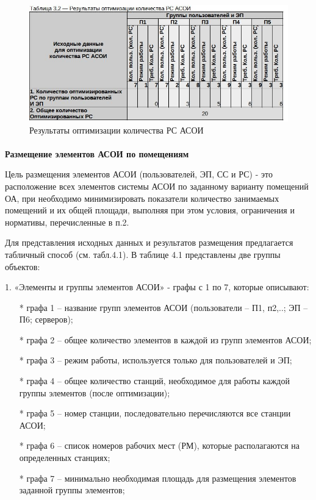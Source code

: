 \documentclass[12pt, a4paper, simple]{eskdtext}
\begin{document}
    \begin{figure}[ht!]
        \centering
        \includegraphics[width=14cm]
            {_docs/Таблица3-2РезультатыОптимизацииКоличестваРСАСОИ.jpg}
        \caption{Результаты оптимизации количества РС АСОИ}
    \end{figure}

    \paragraph{} \textbf{Размещение элементов АСОИ по помещениям}

    Цель размещения элементов АСОИ (пользователей, ЭП, СС и РС) - это расположение всех эле­ментов системы АСОИ
    по заданному варианту помещений ОА, при необходимо минимизировать пока­затели количество занимаемых помещений
    и их общей площади, выполняя при этом условия, ограни­чения и нормативы, перечисленные в п.2.
    
    Для представления исходных данных и результатов размещения предлагается табличный способ (см. табл.4.1).
    В таблице 4.1 представлены две группы объектов:

    1. «Элементы и группы элементов АСОИ» - графы с 1 по 7, которые описывают:

    \begin{itemize}
        \item[*] графа 1 – название групп элементов АСОИ (пользователи – П1, п2,..; ЭП – П6; серверов);
        \item[*] графа 2 – общее количество элементов в каждой из групп элементов АСОИ;
        \item[*] графа 3 – режим работы, используется только для пользователей и ЭП;
        \item[*] графа 4 – общее количество станций, необходимое для работы каждой группы элементов (по­сле оптимизации); 
        \item[*] графа 5 – номер станции, последовательно перечисляются все станции АСОИ;
        \item[*] графа 6 – список номеров рабочих мест (РМ), которые располагаются на определенных стан­циях;
        \item[*] графа 7 – минимально необходимая площадь для размещения элементов заданной группы элементов;
    \end{itemize}
    
\end{document}
